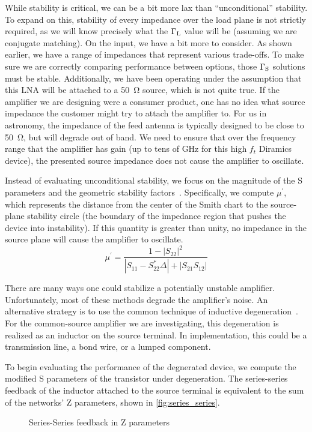 While stability is critical, we can be a bit more lax than ``unconditional'' stability.
To expand on this, stability of every impedance over the load plane is not strictly required, as we will know precisely what the $\Gamma_{\text{L}}$ value will be (assuming we are conjugate matching).
On the input, we have a bit more to consider.
As shown earlier, we have a range of impedances that represent various trade-offs.
To make sure we are correctly comparing performance between options, those $\Gamma_{\text{S}}$ solutions must be stable.
Additionally, we have been operating under the assumption that this LNA will be attached to a \qty{50}{\ohm} source, which is not quite true.
If the amplifier we are designing were a consumer product, one has no idea what source impedance the customer might try to attach the amplifier to.
For us in astronomy, the impedance of the feed antenna is typically designed to be close to \qty{50}{\ohm}, but will degrade out of band.
We need to ensure that over the frequency range that the amplifier has gain (up to tens of GHz for this high $f_t$ Diramics device), the presented source impedance does not cause the amplifier to oscillate.

Instead of evaluating unconditional stability, we focus on the magnitude of the S parameters and the geometric stability factors~\cite{edwardsNewCriterionLinear1992}.
Specifically, we compute $\mu^\prime$, which represents the distance from the center of the Smith chart to the source-plane stability circle (the boundary of the impedance region that pushes the device into instability).
If this quantity is greater than unity, no impedance in the source plane will cause the amplifier to oscillate.
\begin{equation}
    \mu^\prime = \frac{1-|S_{22}|^2}{|S_{11}-S_{22}^*\Delta| + |S_{21}S_{12}|}
    \label{eq:mu_prime}
\end{equation}

There are many ways one could stabilize a potentially unstable amplifier.
Unfortunately, most of these methods degrade the amplifier's noise.
An alternative strategy is to use the common technique of inductive degeneration~\cite{lerouxDetailedStudyCommonSource2005}.
For the common-source amplifier we are investigating, this degeneration is realized as an inductor on the source terminal.
In implementation, this could be a transmission line, a bond wire, or a lumped component.

To begin evaluating the performance of the degnerated device, we compute the modified S parameters of the transistor under degeneration.
The series-series feedback of the inductor attached to the source terminal is equivalent to the sum of the networks' Z parameters, shown in \autoref{fig:series_series}.
%
\begin{figure}[ht!]
    \centering
    
    \caption{Series-Series feedback in Z parameters}
    \label{fig:series_series}
\end{figure}

